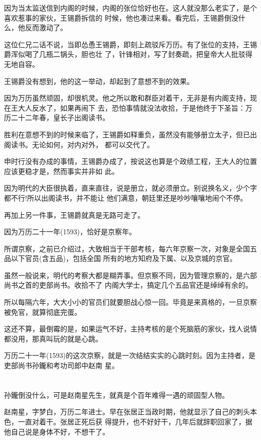 \documentclass[11pt,a4paper,onecolumn]{article}
\begin{document}
因为当太监送信到内阁的时候，内阁的张位恰好也在。这人就没那么老实了，是个喜欢惹事的家伙，王锡爵拆信的
时候，他也凑过来看。看完后，王锡爵倒没什么，他反而激动了。

这位仁兄二话不说，当即怂恿王锡爵，即刻上疏驳斥万历。有了张位的支持，王锡爵浑似喝了几瓶二锅头，胆也壮
了，针锋相对，写了封奏疏，把皇帝大人批驳得无地自容。

王锡爵没有想到，他的这一举动，却起到了意想不到的效果。

因为万历虽然顽固，却很机灵。他之所以敢和群臣对着干，无非是有内阁支持，现在王大人反水了，如果再闹下
去，恐怕事情就没法收拾，于是他终于下圣旨：万历二十二年春，皇长子出阁读书。

胜利在意想不到的时候来临了，王锡爵如释重负，虽然没有能够册立太子，但已出阁读书。无论如何，对内对外，
都可以交代了。

申时行没有办成的事情，王锡爵办成了，按说这也算是个政绩工程，王大人的位置应该更稳才是，然而事实并非如
此。

因为明代的大臣很执着，直来直往，说是册立，就必须册立。别说换名义，少个字都不行!所以出阁读书，并不能让
他们满意，朝廷里还是吵吵嚷嚷地闹个不停。

再加上另一件事，王锡爵就真是无路可走了。

因为万历二十一年(1593)，恰好是京察年。

所谓京察，之前已介绍过，大致相当于干部考核，每六年京察一次，对象是全国五品以下官员(含五品)，包括全国
所有的地方知府及下属、以及京城的京官。

虽然一般说来，明代的考察大都是糊弄事。但京察不同，因为管理京察的，是六部尚书之首的吏部尚书。收拾不了
内阁大学士，搞定几个五品官还是绰绰有余的。

所以每隔六年，大大小小的官员们就要胆战心惊一回。毕竟是来真格的，一旦京察被免官，就算彻底完蛋。

这还不算，最倒霉的是，如果运气不好，主持考核的是个死脑筋的家伙，找人说情都没用，那真叫玩的就是心跳。

万历二十一年(1593)的这次京察，就是一次结结实实的心跳时刻。因为主持者，是吏部尚书孙鑨和考功司郎中赵南
星。

\section[\thesection]{}

孙鑨倒没什么，可是赵南星先生，就真是个百年难得一遇的顽固型人物。

赵南星，字梦白，万历二年进士。早在张居正当政时期，他就显示了自己的刺头本色，一直对着干。张居正死后获
得提升，也不好好干，几年后就辞职回家了，据他自己说是身体不好，不想干了。
\end{document}

